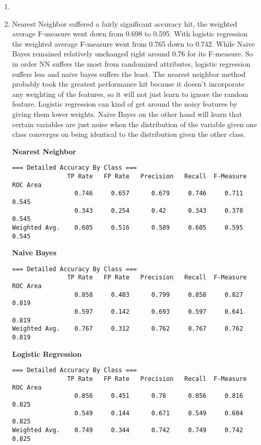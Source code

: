 \documentclass[12pt]{article}
\begin{document}
\begin{enumerate}
\begin{enumerate}
\item %

\item %

Nearest Neighbor suffered a fairly significant accuracy hit, the weighted average F-measure went down from 0.698 to 0.595. With logistic regression the weighted average F-measure went from 0.765 down to  0.742. While Naive Bayes remained relatively unchanged right around 0.76 for its F-measure. So in order NN suffers the most from randomized attributes, logistic regression suffers less and naive bayes suffers the least. The nearest neighbor method probably took the greatest performance hit because it doesn't incorporate any weighting of the features, so it will not just learn to ignore the random feature. Logistic regression can kind of get around the noisy features by giving them lower weights. Naive Bayes on the other hand will learn that certain variables are just noise when the distribution of the variable given one class converges on being identical to the distribution given the other class.

{\bf Nearest Neighbor}
\begin{verbatim}
=== Detailed Accuracy By Class ===
               TP Rate   FP Rate   Precision   Recall  F-Measure   ROC Area 
                 0.746     0.657      0.679     0.746     0.711      0.545  
                 0.343     0.254      0.42      0.343     0.378      0.545   
Weighted Avg.    0.605     0.516      0.589     0.605     0.595      0.545
\end{verbatim}

{\bf Naive Bayes}
\begin{verbatim}
=== Detailed Accuracy By Class ===
               TP Rate   FP Rate   Precision   Recall  F-Measure   ROC Area 
                 0.858     0.403      0.799     0.858     0.827      0.819 
                 0.597     0.142      0.693     0.597     0.641      0.819 
Weighted Avg.    0.767     0.312      0.762     0.767     0.762      0.819
\end{verbatim}

{\bf Logistic Regression}
\begin{verbatim}
=== Detailed Accuracy By Class ===
               TP Rate   FP Rate   Precision   Recall  F-Measure   ROC Area
                 0.856     0.451      0.78      0.856     0.816      0.825  
                 0.549     0.144      0.671     0.549     0.604      0.825 
Weighted Avg.    0.749     0.344      0.742     0.749     0.742      0.825
\end{verbatim}



\end{enumerate}
\end{enumerate}
\end{document}
